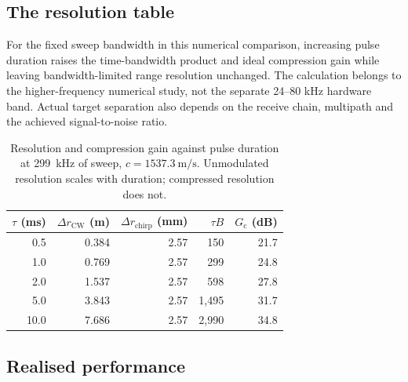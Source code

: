 \documentclass[conference,a4paper]{IEEEtran}
\begin{document}
\subsection{The resolution table}

For the fixed sweep bandwidth in this numerical comparison, increasing pulse
duration raises the time-bandwidth product and ideal compression gain while
leaving bandwidth-limited range resolution unchanged. The calculation belongs
to the higher-frequency numerical study, not the separate 24--80 kHz hardware
band. Actual target separation also depends on the receive chain, multipath and
the achieved signal-to-noise ratio.

\begin{table}[t]
\centering
\small
\begin{tabular}{rrrrr}
\toprule
\textbf{$\tau$ (ms)} & \textbf{$\Delta r_{\text{CW}}$ (m)}
& \textbf{$\Delta r_{\text{chirp}}$ (mm)} & \textbf{$\tau B$}
& \textbf{$G_{\text{c}}$ (dB)} \\
\midrule
0.5  & 0.384 & 2.57 & 150   & 21.7 \\
1.0  & 0.769 & 2.57 & 299   & 24.8 \\
2.0  & 1.537 & 2.57 & 598   & 27.8 \\
5.0  & 3.843 & 2.57 & 1{,}495 & 31.7 \\
10.0 & 7.686 & 2.57 & 2{,}990 & 34.8 \\
\bottomrule
\end{tabular}
\caption{Resolution and compression gain against pulse duration at
\SI{299}{\kilo\hertz} of sweep, $c = \SI{1537.3}{\metre\per\second}$.
Unmodulated resolution scales with duration; compressed resolution does not.}
\label{tab:resolution}
\end{table}

\subsection{Realised performance}
\end{document}
